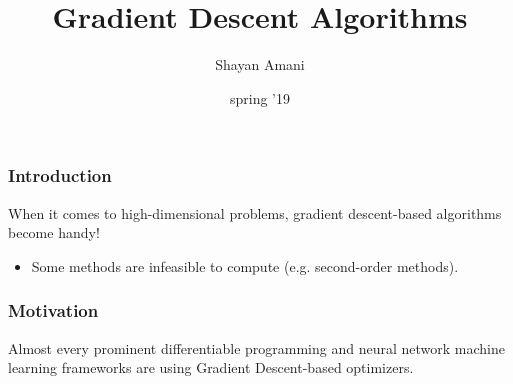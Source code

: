 \documentclass{beamer}
\title{Gradient Descent Algorithms}
\author{Shayan Amani}
\date{spring '19}
\institute{Department of Computer Science, University of New Hampshire}
\begin{document}
  \begin{frame}
    \titlepage
  \end{frame}

\begin{frame}
    \frametitle{Introduction}
    
    When it comes to high-dimensional problems, gradient descent-based algorithms become handy!
    \begin{itemize}
        \item Some methods are infeasible to compute (e.g. second-order methods).
    \end{itemize}

  \end{frame}
  
\begin{frame}
    \frametitle{Motivation}
    Almost every prominent differentiable programming and neural network machine learning frameworks are using Gradient Descent-based optimizers. 
    

\end{frame}
\end{document}
